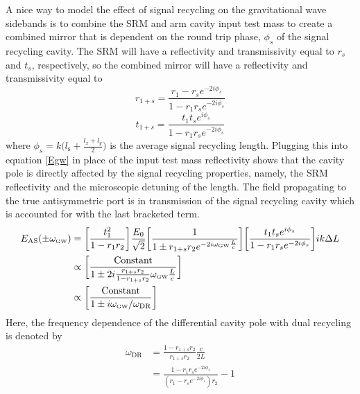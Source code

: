 		A nice way to model the effect of signal recycling on the gravitational wave sidebands is to combine the SRM and  arm cavity input test mass to create a combined  mirror that is dependent on the round trip phase, $\phi_s$ of the signal recycling cavity.  The SRM will have a reflectivity and transmissivity equal to $r_s$ and $t_s$, respectively, so the combined mirror will have a reflectivity and transmissivity equal to
		\begin{equation}
		r_{1+s} = \frac{r_1 - r_s e^{-2i\phi_s}}{1- r_1 r_s e^{-2i\phi_s}}
		\end{equation}
		\begin{equation}
		t_{1+s} = \frac{t_1 t_s e^{i\phi_s}}{1- r_1 r_s e^{-2i\phi_s}}
		\end{equation}
		where $\phi_s = k \big( l_\text{s} + \frac{l_x + l_y}{2} \big)	$ is the average signal recycling length.
		Plugging this into equation \ref{Egw} in place of the input test mass reflectivity shows that the cavity pole is directly affected by the signal recycling properties, namely, the SRM reflectivity and the microscopic detuning of the length. The field propagating to the true antisymmetric port is in transmission of the signal recycling cavity which is accounted for with the last bracketed term. 
		\begin{equation}
		\begin{aligned}
		E_{\text{AS}}(\pm \omega_{\text{\tiny GW}}) & =  \bigg[ \frac{t_1^2}{1-r_1 r_2}\bigg]  \frac{E_0}{\sqrt{2}} \bigg[\frac{ 1}{1 \pm r_{1+s} r_2 e^{-2i  \omega_{\text{\tiny GW}}  \frac{L}{c}}} \bigg] \bigg[\frac{t_1 t_s e^{i\phi_s}}{1- r_1 r_s e^{-2i\phi_s}}\bigg] ik\Delta L\\
		& \propto \bigg[ \frac{ \text{Constant}}{1 \pm 2 i \frac{r_{1+s} r_2}{1- r_{1+s} r_2}  \omega_{\text{\tiny GW}}  \frac{L}{c}}  \bigg]\\
		& \propto \bigg[\frac{\text{Constant}}{1 \pm i \omega_{\text{\tiny GW}}/\omega_{\text{DR}}}\bigg]
		\end{aligned}
		\end{equation}
		Here, the frequency dependence of the differential cavity pole with dual recycling is denoted by
		\begin{equation}
		\begin{aligned}\label{eq:darm_cav_pole}
			\omega_{\text{DR}} 	&=	\frac{1-r_{1+s}r_2}{r_{1+s}r_2}\frac{c}{2L}\\
								&=	\frac{1- r_1r_s e^{-2i\phi_s} }{ (r_1 - r_s e^{-2i\phi_s})r_2} - 1
		\end{aligned}
		\end{equation}
		
